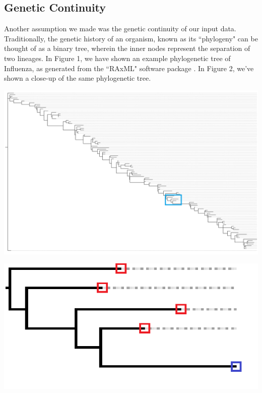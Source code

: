 \documentclass[12pt]{article}
\newenvironment{Figure}
  {\par\medskip\noindent\minipage{\linewidth}}
  {\endminipage\par\medskip}
\begin{document}
\begin{multicols}{2}
\subsection{Genetic Continuity}
Another assumption we made was the genetic continuity of our input data. Traditionally, the genetic history of an organism, known as its ``phylogeny" can be thought of as a binary tree, wherein the inner nodes represent the separation of two lineages. In Figure 1, we have shown an example phylogenetic tree of Influenza, as generated from the ``RAxML" software package \citep{stamatakis2006raxml}. In Figure 2, we've shown a close-up of the same phylogenetic tree.

\begin{Figure}
 \centering
 \includegraphics[width=\linewidth]{H1_Human_Subsample_0.png}
\end{Figure}

\begin{Figure}
 \centering
 \includegraphics[width=\linewidth]{H1_Human_Subsample_0_closeUp.png}
\end{Figure}


\end{multicols}
\end{document}
